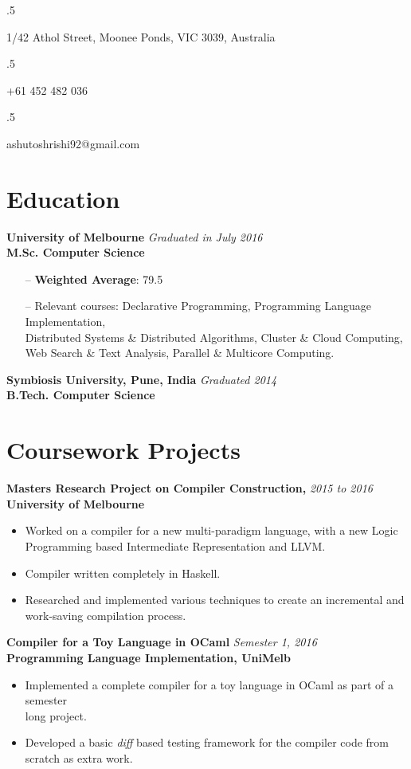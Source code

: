 \documentclass[a4paper,overlapped]{res}
\begin{document}


\begin{resume}
  \moveleft.5\hoffset\centerline{1/42 Athol Street, Moonee Ponds, VIC 3039, Australia}
  \moveleft.5\hoffset\centerline{+61 452 482 036}
  \moveleft.5\hoffset\centerline{ashutoshrishi92@gmail.com}

  \section{Education}  
  \textbf{University of Melbourne} \hfill \textit{Graduated in July 2016} \\
  \textbf{M.Sc. Computer Science }
  \begin{itemize} \itemsep -2pt
  \item[--] \textbf{Weighted Average}: 79.5
  \item[--] Relevant courses: Declarative Programming, Programming Language
    Implementation, \\ Distributed Systems \& Distributed Algorithms, Cluster
    \& Cloud Computing,\\ Web Search \& Text Analysis, Parallel \& Multicore
    Computing.
  \end{itemize}

  \textbf{Symbiosis University, Pune, India} \hfill \textit{Graduated 2014} \\
  \textbf{B.Tech. Computer Science }


  \section{Coursework Projects}
  
  \textbf{Masters Research Project on Compiler Construction,} \hfill
  \textit{2015 to 2016}\\
  \textbf{University of Melbourne}
  \begin{itemize}
  \item Worked on a compiler for a new multi-paradigm language, with a new
    Logic \\ Programming based Intermediate Representation and LLVM.
  \item Compiler written completely in Haskell.
  \item Researched and implemented various techniques to create an incremental
    and \\work-saving compilation process.
  \end{itemize}

  \textbf{Compiler for a Toy Language in OCaml} \hfill \textit{Semester 1,
    2016}\\
  \textbf{Programming Language Implementation, UniMelb}
  \begin{itemize}
  \item Implemented a complete compiler for a toy language in OCaml as part of
    a semester\\ long project.
  \item Developed a basic \textit{diff} based testing framework for the
    compiler code from\\ scratch as extra work.
  \end{itemize}
  


\end{resume}
\end{document}
